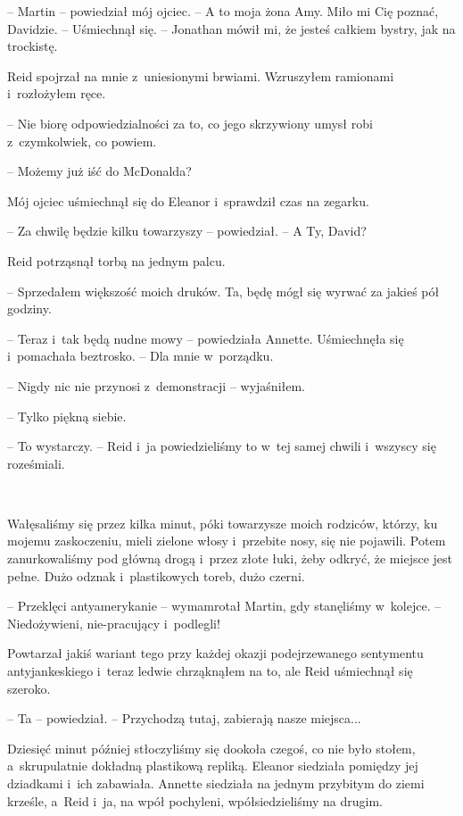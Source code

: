 \documentclass[oneside,polish,11pt,sfheadings]{mwbk}
\begin{document}
-- Martin -- powiedział mój ojciec. -- A to moja żona Amy. Miło mi Cię
poznać, Davidzie. -- Uśmiechnął się. -- Jonathan mówił mi, że jesteś
całkiem bystry, jak na trockistę.

Reid spojrzał na mnie z~uniesionymi brwiami. Wzruszyłem ramionami i~rozłożyłem ręce. 

-- Nie biorę odpowiedzialności za to, co jego skrzywiony
umysł robi z~czymkolwiek, co powiem.

-- Możemy już iść do McDonalda?

Mój ojciec uśmiechnął się do Eleanor i~sprawdził czas na zegarku. 

-- Za
chwilę będzie kilku towarzyszy -- powiedział. -- A Ty, David?

Reid potrząsnął torbą na jednym palcu. 

-- Sprzedałem większość moich
druków. Ta, będę mógł się wyrwać za jakieś pół godziny.

-- Teraz i~tak będą nudne mowy -- powiedziała Annette. Uśmiechnęła się i~pomachała beztrosko. -- Dla mnie w~porządku.

-- Nigdy nic nie przynosi z~demonstracji -- wyjaśniłem.

-- Tylko piękną siebie.

-- To wystarczy. -- Reid i~ja powiedzieliśmy to w~tej samej chwili i~wszyscy się roześmiali.

~

Wałęsaliśmy się przez kilka minut, póki towarzysze moich rodziców,
którzy, ku mojemu zaskoczeniu, mieli zielone włosy i~przebite nosy, się
nie pojawili. Potem zanurkowaliśmy pod główną drogą i~przez złote łuki,
żeby odkryć, że miejsce jest pełne. Dużo odznak i~plastikowych toreb,
dużo czerni.

-- Przeklęci antyamerykanie -- wymamrotał Martin, gdy stanęliśmy w~kolejce. -- Niedożywieni, nie-pracujący i~podlegli!

Powtarzał jakiś wariant tego przy każdej okazji podejrzewanego
sentymentu antyjankeskiego i~teraz ledwie chrząknąłem na to, ale Reid
uśmiechnął się szeroko. 

-- Ta -- powiedział. -- Przychodzą tutaj, zabierają
nasze miejsca...

Dziesięć minut później stłoczyliśmy się dookoła czegoś, co nie było
stołem, a~skrupulatnie dokładną plastikową repliką. Eleanor siedziała
pomiędzy jej dziadkami i~ich zabawiała. Annette siedziała na jednym
przybitym do ziemi krześle, a~Reid i~ja, na wpół pochyleni,
wpółsiedzieliśmy na drugim.
\end{document}
